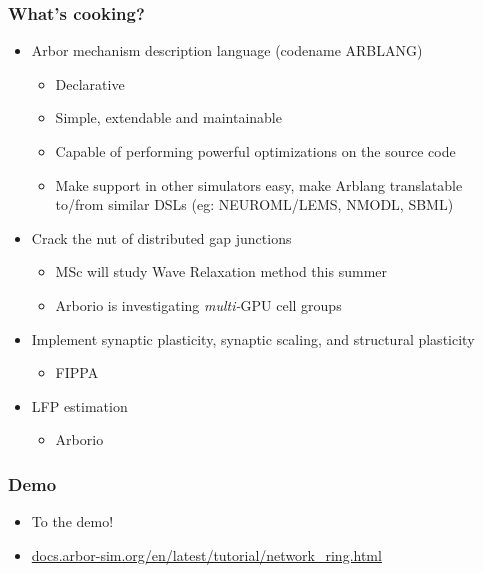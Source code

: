 \documentclass[t]{beamer}
\begin{document}
\begin{frame}
    \frametitle{What's cooking?}
    \begin{itemize}
    \item Arbor mechanism description language (codename ARBLANG)
    \begin{itemize}
    \item Declarative
    \item Simple, extendable and maintainable
    \item Capable of performing powerful optimizations on the source code
    \item Make support in other simulators easy, make Arblang translatable to/from similar DSLs (eg: NEUROML/LEMS, NMODL, SBML)
    \end{itemize}
    \item Crack the nut of distributed gap junctions
    \begin{itemize}
    \item MSc will study Wave Relaxation method this summer
    \item Arborio is investigating \textit{multi-}GPU cell groups
    \end{itemize}
    \item Implement synaptic plasticity, synaptic scaling, and structural plasticity
    \begin{itemize}
    \item FIPPA
    \end{itemize}
    \item LFP estimation
    \begin{itemize}
    \item Arborio
    \end{itemize}
    \end{itemize}
\end{frame}

\begin{frame}
    \frametitle{Demo}
    \begin{itemize}
    \item To the demo!
    \item \url{docs.arbor-sim.org/en/latest/tutorial/network_ring.html}
    \end{itemize}
\end{frame}
\end{document}
